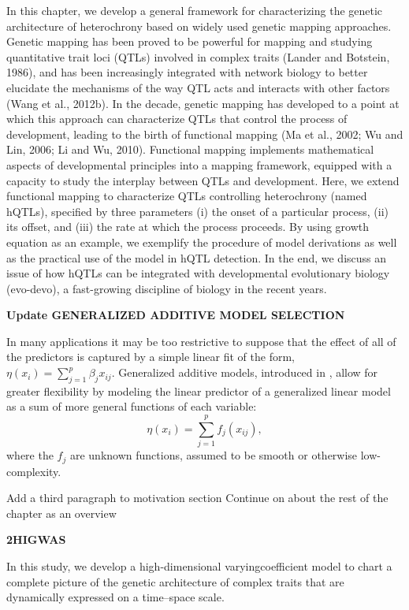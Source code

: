 \documentclass[11pt,]{book}
\theoremstyle{definition}
\theoremstyle{definition}
\theoremstyle{remark}
\begin{document}
In this chapter, we develop a general framework for characterizing the
genetic architecture of heterochrony based on widely used genetic
mapping approaches. Genetic mapping has been proved to be powerful for
mapping and studying quantitative trait loci (QTLs) involved in complex
traits (Lander and Botstein, 1986), and has been increasingly integrated
with network biology to better elucidate the mechanisms of the way QTL
acts and interacts with other factors (Wang et al., 2012b). In the
decade, genetic mapping has developed to a point at which this approach
can characterize QTLs that control the process of development, leading
to the birth of functional mapping (Ma et al., 2002; Wu and Lin, 2006;
Li and Wu, 2010). Functional mapping implements mathematical aspects of
developmental principles into a mapping framework, equipped with a
capacity to study the interplay between QTLs and development. Here, we
extend functional mapping to characterize QTLs controlling heterochrony
(named hQTLs), specified by three parameters (i) the onset of a
particular process, (ii) its offset, and (iii) the rate at which the
process proceeds. By using growth equation as an example, we exemplify
the procedure of model derivations as well as the practical use of the
model in hQTL detection. In the end, we discuss an issue of how hQTLs
can be integrated with developmental evolutionary biology (evo-devo), a
fast-growing discipline of biology in the recent years.

\textbf{Update GENERALIZED ADDITIVE MODEL SELECTION
\cite{chouldechova2015generalized}}

In many applications it may be too restrictive to suppose that the
effect of all of the predictors is captured by a simple linear fit of
the form, \(η(x_i) = \sum_{j=1}^p \beta_jx_{ij}\). Generalized additive
models, introduced in \cite{hastie1990generalized}, allow for greater
flexibility by modeling the linear predictor of a generalized linear
model as a sum of more general functions of each variable:
\[η(x_i) = \sum_{j=1}^p f_j(x_{ij}),\] where the \(f_j\) are unknown
functions, assumed to be smooth or otherwise low-complexity.

Add a third paragraph to motivation section Continue on about the rest
of the chapter as an overview

\textbf{2HIGWAS}

In this study, we develop a high-dimensional varyingcoefficient model to
chart a complete picture of the genetic architecture of complex traits
that are dynamically expressed on a time--space scale.
\end{document}
